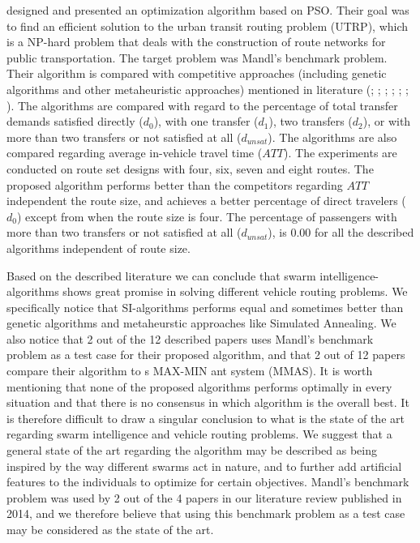\citet{kechagiopoulos14} designed and presented an optimization algorithm based on PSO. Their goal was to find an efficient solution to the urban transit routing problem (UTRP), which is a NP-hard problem that deals with the construction of route networks for public transportation. The target problem was Mandl's benchmark problem. Their algorithm is compared with competitive approaches (including genetic algorithms and other metaheuristic approaches) mentioned in literature (\citet{baaj91}; \citet{chakroborty02}; \citet{kidwai98}; \citet{fan10}; \citet{fan09-2}; \citet{zhang10}; \citet{chew12}). The algorithms are compared with regard to the percentage of total transfer demands satisfied directly ($d_0$), with one transfer ($d_1$), two transfers ($d_2$), or with more than two transfers or not satisfied at all ($d_{unsat}$). The algorithms are also compared regarding average in-vehicle travel time ($ATT$). The experiments are conducted on route set designs with four, six, seven and eight routes. The proposed algorithm performs better than the competitors regarding $ATT$ independent the route size, and achieves a better percentage of direct travelers ($d_0$) except from when the route size is four. The percentage of passengers with more than two transfers or not satisfied at all ($d_{unsat}$), is $0.00$ for all the described algorithms independent of route size. \newline

Based on the described literature we can conclude that swarm intelligence-algorithms shows great promise in solving different vehicle routing problems. We specifically notice that SI-algorithms performs equal and sometimes better than genetic algorithms and  metaheurstic approaches like Simulated Annealing. We also notice that 2 out of the 12 described papers uses Mandl's benchmark problem as a test case for their proposed algorithm, and that 2 out of 12 papers compare their algorithm to \citet{stutzle99}s MAX-MIN ant system (MMAS). It is worth mentioning that none of the proposed algorithms performs optimally in every situation and that there is no consensus in which algorithm is the overall best. It is therefore difficult to draw a singular conclusion to what is the state of the art regarding swarm intelligence and vehicle routing problems. We suggest that a general state of the art regarding the algorithm may be described as being inspired by the way different swarms act in nature, and to further add artificial features to the individuals to optimize for certain objectives. Mandl's benchmark problem was used by 2 out of the 4 papers in our literature review published in 2014, and we therefore believe that using this benchmark problem as a test case may be considered as the state of the art.



